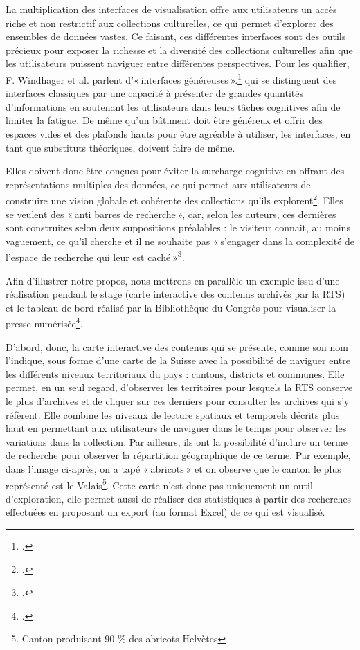 La multiplication des interfaces de visualisation offre aux utilisateurs un accès riche et non restrictif aux collections culturelles, ce qui permet d’explorer des ensembles de données vastes. Ce faisant, ces différentes interfaces sont des outils précieux pour exposer la richesse et la diversité des collections culturelles afin que les utilisateurs puissent naviguer entre différentes perspectives. Pour les qualifier, F. Windhager et al. parlent d’« interfaces généreuses ».\footcite[p. 5]{windhager_orchestrating_2018} qui se distinguent des interfaces classiques par une capacité à présenter de grandes quantités d’informations en soutenant les utilisateurs dans leurs tâches cognitives afin de limiter la fatigue. De même qu’un bâtiment doit être généreux et offrir des espaces vides et des plafonds hauts pour être agréable à utiliser, les interfaces, en tant que substituts théoriques, doivent faire de même.

Elles doivent donc être conçues pour éviter la surcharge cognitive en offrant des représentations multiples des données, ce qui permet aux utilisateurs de construire une vision globale et cohérente des collections qu’ils explorent\footcite[pp. 5-6]{windhager_orchestrating_2018}. Elles se veulent des « anti barres de recherche », car, selon les auteurs, ces dernières sont construites selon deux suppositions préalables : le visiteur connait, au moins vaguement, ce qu’il cherche et il ne souhaite pas « s’engager dans la complexité de l’espace de recherche qui leur est caché »\footcite[p. 6]{windhager_orchestrating_2018}.

Afin d’illustrer notre propos, nous mettrons en parallèle un exemple issu d’une réalisation pendant le stage (carte interactive des contenus archivés par la RTS) et le tableau de bord réalisé par la Bibliothèque du Congrès pour visualiser la presse numérisée\footcite[tableau de bord accessible en suivant l'url suivante \url{https://public.tableau.com/app/profile/chronicling.america/viz/ChroniclingAmericaTemporalCoveragebyStateMap/TemporalStateCoverage}]{noauthor_chronicling_nodate}.

D’abord, donc, la carte interactive des contenus qui se présente, comme son nom l’indique, sous forme d’une carte de la Suisse avec la possibilité de naviguer entre les différents niveaux territoriaux du pays : cantons, districts et communes. Elle permet, en un seul regard, d’observer les territoires pour lesquels la RTS conserve le plus d’archives et de cliquer sur ces derniers pour consulter les archives qui s’y réfèrent. Elle combine les niveaux de lecture spatiaux et temporels décrits plus haut en permettant aux utilisateurs de naviguer dans le temps pour observer les variations dans la collection. Par ailleurs, ils ont la possibilité d’inclure un terme de recherche pour observer la répartition géographique de ce terme. Par exemple, dans l’image ci-après, on a tapé « abricots » et on observe que le canton le plus représenté est le Valais\footnote{Canton produisant 90 \% des abricots Helvètes}. Cette carte n’est donc pas uniquement un outil d’exploration, elle permet aussi de réaliser des statistiques à partir des recherches effectuées en proposant un export (au format Excel) de ce qui est visualisé.



